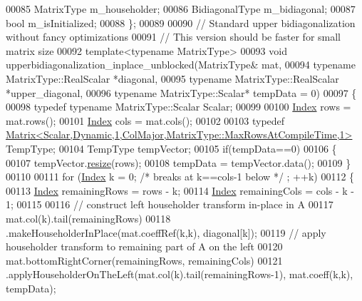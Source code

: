 \begin{DoxyCode}
00085     MatrixType m\_householder;
00086     BidiagonalType m\_bidiagonal;
00087     \textcolor{keywordtype}{bool} m\_isInitialized;
00088 \};
00089 
00090 \textcolor{comment}{// Standard upper bidiagonalization without fancy optimizations}
00091 \textcolor{comment}{// This version should be faster for small matrix size}
00092 \textcolor{keyword}{template}<\textcolor{keyword}{typename} MatrixType>
00093 \textcolor{keywordtype}{void} upperbidiagonalization\_inplace\_unblocked(MatrixType& mat,
00094                                               \textcolor{keyword}{typename} MatrixType::RealScalar *diagonal,
00095                                               \textcolor{keyword}{typename} MatrixType::RealScalar *upper\_diagonal,
00096                                               \textcolor{keyword}{typename} MatrixType::Scalar* tempData = 0)
00097 \{
00098   \textcolor{keyword}{typedef} \textcolor{keyword}{typename} MatrixType::Scalar Scalar;
00099 
00100   \hyperlink{class_eigen_1_1internal_1_1_upper_bidiagonalization_adcb14f3919a3dcc9977ba6b8105087fe}{Index} rows = mat.rows();
00101   \hyperlink{class_eigen_1_1internal_1_1_upper_bidiagonalization_adcb14f3919a3dcc9977ba6b8105087fe}{Index} cols = mat.cols();
00102 
00103   \textcolor{keyword}{typedef} \hyperlink{group___core___module_class_eigen_1_1_matrix}{Matrix<Scalar,Dynamic,1,ColMajor,MatrixType::MaxRowsAtCompileTime,1>}
       TempType;
00104   TempType tempVector;
00105   \textcolor{keywordflow}{if}(tempData==0)
00106   \{
00107     tempVector.\hyperlink{class_eigen_1_1_plain_object_base_a99d9054ee2d5a40c6e00ded0265e9cea}{resize}(rows);
00108     tempData = tempVector.data();
00109   \}
00110 
00111   \textcolor{keywordflow}{for} (\hyperlink{class_eigen_1_1internal_1_1_upper_bidiagonalization_adcb14f3919a3dcc9977ba6b8105087fe}{Index} k = 0; \textcolor{comment}{/* breaks at k==cols-1 below */} ; ++k)
00112   \{
00113     \hyperlink{class_eigen_1_1internal_1_1_upper_bidiagonalization_adcb14f3919a3dcc9977ba6b8105087fe}{Index} remainingRows = rows - k;
00114     \hyperlink{class_eigen_1_1internal_1_1_upper_bidiagonalization_adcb14f3919a3dcc9977ba6b8105087fe}{Index} remainingCols = cols - k - 1;
00115 
00116     \textcolor{comment}{// construct left householder transform in-place in A}
00117     mat.col(k).tail(remainingRows)
00118        .makeHouseholderInPlace(mat.coeffRef(k,k), diagonal[k]);
00119     \textcolor{comment}{// apply householder transform to remaining part of A on the left}
00120     mat.bottomRightCorner(remainingRows, remainingCols)
00121        .applyHouseholderOnTheLeft(mat.col(k).tail(remainingRows-1), mat.coeff(k,k), tempData);

\end{DoxyCode}
